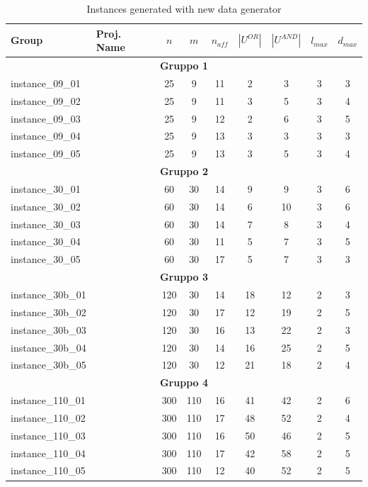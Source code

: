 \documentclass[12pt,a4paper,openright,twoside]{book}
\begin{document}
\begin{table}[H]
\scriptsize
\caption{Instances generated with new data generator}
\label{Tab.newData}
\centering

\renewcommand{\arraystretch}{1.1}

\begin{tabular}{llccccccc}
\hline
\textbf{Group} & \textbf{Proj. Name} & $n$ & $m$ & $n_{aff}$ & $|U^{OR}|$ & $|U^{AND}|$ & $l_{max}$ & $d_{max}$ \\
\hline
\midrule

\multicolumn{9}{c}{\textbf{Gruppo 1}} \\
instance\_09\_01 &  &  25 & 9 & 11 & 2 & 3 & 3 & 3 \\
instance\_09\_02 &  &  25 & 9 & 11 & 3 & 5 & 3 & 4 \\
instance\_09\_03 &  &  25 & 9 & 12 & 2 & 6 & 3 & 5 \\
instance\_09\_04 &  &  25 & 9 & 13 & 3 & 3 & 3 & 3 \\
instance\_09\_05 &  &  25 & 9 & 13 & 3 & 5 & 3 & 4 \\
\midrule

\multicolumn{9}{c}{\textbf{Gruppo 2}} \\
instance\_30\_01 &  &  60 & 30 & 14 & 9 & 9 & 3 & 6 \\
instance\_30\_02 &  &  60 & 30 & 14 & 6 & 10 & 3 & 6 \\
instance\_30\_03 &  &  60 & 30 & 14 & 7 & 8 & 3 & 4 \\
instance\_30\_04 &  &  60 & 30 & 11 & 5 & 7 & 3 & 5 \\
instance\_30\_05 &  &  60 & 30 & 17 & 5 & 7 & 3 & 3 \\
\midrule

\multicolumn{9}{c}{\textbf{Gruppo 3}} \\
instance\_30b\_01 &  &  120 & 30 & 14 & 18 & 12 & 2 & 3 \\
instance\_30b\_02 &  &  120 & 30 & 17 & 12 & 19 & 2 & 5 \\
instance\_30b\_03 &  &  120 & 30 & 16 & 13 & 22 & 2 & 3 \\
instance\_30b\_04 &  &  120 & 30 & 14 & 16 & 25 & 2 & 5 \\
instance\_30b\_05 &  &  120 & 30 & 12 & 21 & 18 & 2 & 4 \\
\midrule

\multicolumn{9}{c}{\textbf{Gruppo 4}} \\
instance\_110\_01 &  &  300 & 110 & 16 & 41 & 42 & 2 & 6 \\
instance\_110\_02 &  &  300 & 110 & 17 & 48 & 52 & 2 & 4 \\
instance\_110\_03 &  &  300 & 110 & 16 & 50 & 46 & 2 & 5 \\
instance\_110\_04 &  &  300 & 110 & 17 & 42 & 58 & 2 & 5 \\
instance\_110\_05 &  &  300 & 110 & 12 & 40 & 52 & 2 & 5 \\
\midrule


\end{tabular}
\end{table}
\end{document}
